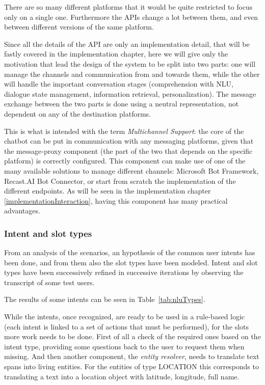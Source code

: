 There are so many different platforms that it would be quite restricted to focus only on a single one. Furthermore the APIs change a lot between them, and even between different versions of the same platform.

Since all the details of the API are only an implementation detail, that will be fastly covered in the implementation chapter, here we will give only the motivation that lead the design of the system to be split into two parts: one will manage the channels and communication from and towards them, while the other will handle the important conversation stages (comprehension with NLU, dialogue state management, information retrieval, personalization). The message exchange between the two parts is done using a neutral representation, not dependent on any of the destination platforms.

This is what is intended with the term \textit{Multichannel Support}: the core of the chatbot can be put in communication with any messaging platforms, given that the message-proxy component (the part of the two that depends on the specific platform) is correctly configured. This component can make use of one of the many available solutions to manage different channels: Microsoft Bot Framework, Recast.AI Bot Connector, or start from scratch the implementation of the different endpoints. As will be seen in the implementation chapter \ref{implementationInteraction}, having this component has many practical advantages.

\subsubsection{Intent and slot types}
\label{approachTypes}

From an analysis of the scenarios, an hypothesis of the common user intents has been done, and from them also the slot types have been modeled. Intent and slot types have been successively refined in successive iterations by observing the transcript of some test users.

The results of some intents can be seen in Table~\ref{tab:nluTypes}.




While the intents, once recognized, are ready to be used in a rule-based logic (each intent is linked to a set of actions that must be performed), for the slots more work needs to be done. First of all a check of the required ones based on the intent type, providing some questions back to the user to request them when missing. And then another component, the \textit{entity resolver}, needs to translate text spans into living entities. For the entities of type LOCATION this corresponds to translating a text into a location object with latitude, longitude, full name.

